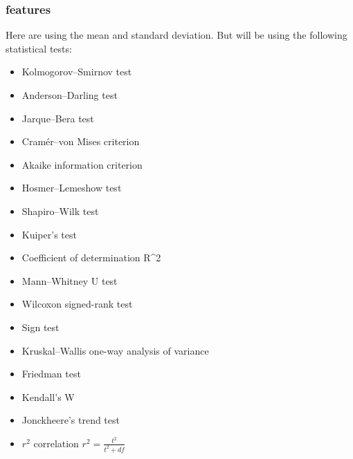 \documentclass{article}
\newcommand{\comm}[2][inline]{\color{green} #2 \color{black}}
\begin{document}



\subsubsection{features} \label{features-sec}
Here are using the mean and standard deviation. But will be using the following statistical tests:
\begin{itemize}
\item Kolmogorov–Smirnov test
\item Anderson–Darling test
\item Jarque–Bera test
\item Cramér–von Mises criterion
\item Akaike information criterion
\item Hosmer–Lemeshow test
\item Shapiro–Wilk test
\item Kuiper's test
\item Coefficient of determination R\^{}2
\item Mann–Whitney U test
\item Wilcoxon signed-rank test
\item Sign test
\item Kruskal–Wallis one-way analysis of variance
\item Friedman test
\item Kendall's W
\item Jonckheere's trend test
\item $r^2$ correlation $ r^2 = \frac{t^2}{t^2 + df} $
\end{itemize}
\end{document}
